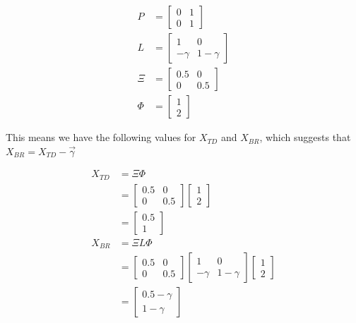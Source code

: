 \documentclass{article}
\begin{document}
\begin{align}
P &= \begin{bmatrix}
  0 & 1 \\
  0 & 1
\end{bmatrix} \\
L &= \begin{bmatrix}
  1 & 0 \\
  -\gamma & 1-\gamma
\end{bmatrix} \\
\Xi &= \begin{bmatrix}
  0.5 & 0 \\
  0 & 0.5
\end{bmatrix} \\
\Phi &= \begin{bmatrix}
  1 \\
  2
\end{bmatrix}
\end{align}

This means we have the following values for $X_{TD}$ and $X_{BR}$, which suggests that $X_{BR} = X_{TD} - \vec{\gamma}$

\begin{align}
  X_{TD} &= \Xi\Phi \\
  &= \begin{bmatrix}
    0.5 & 0 \\
    0 & 0.5
  \end{bmatrix} \begin{bmatrix}
    1 \\
    2
  \end{bmatrix} \\
  &= \begin{bmatrix}
    0.5 \\
    1
  \end{bmatrix} \\
  X_{BR} &= \Xi L \Phi \\
  &= \begin{bmatrix}
    0.5 & 0 \\
    0 & 0.5
  \end{bmatrix} \begin{bmatrix}
    1 & 0 \\
    -\gamma & 1-\gamma
  \end{bmatrix} \begin{bmatrix}
    1 \\
    2
  \end{bmatrix} \\
  &= \begin{bmatrix}
    0.5 - \gamma \\
    1 - \gamma
  \end{bmatrix}
\end{align}
\end{document}
